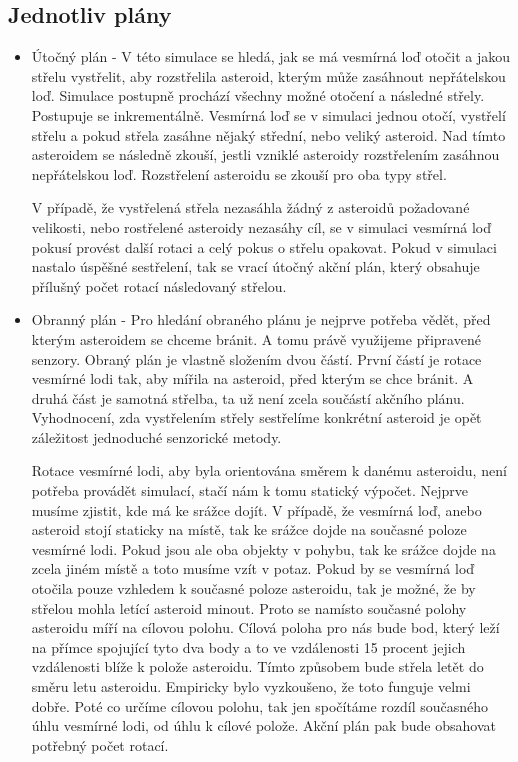 \subsection{Jednotliv plány}
\begin{itemize}
    \item Útočný plán - V této simulace se hledá, jak se má vesmírná loď otočit a jakou střelu vystřelit, aby rozstřelila asteroid, kterým může zasáhnout nepřátelskou loď.
        Simulace postupně prochází všechny možné otočení a následné střely. Postupuje se inkrementálně. Vesmírná loď se v simulaci jednou otočí, vystřelí střelu a pokud střela zasáhne nějaký střední, nebo veliký asteroid. 
        Nad tímto asteroidem se následně zkouší, jestli vzniklé asteroidy rozstřelením zasáhnou nepřátelskou loď. Rozstřelení asteroidu se zkouší pro oba typy střel.
        \par
        V případě, že vystřelená střela nezasáhla žádný z asteroidů požadované velikosti, nebo rostřelené asteroidy nezasáhy cíl, se v simulaci vesmírná loď pokusí provést další rotaci a celý pokus o střelu opakovat.
        Pokud v simulaci nastalo úspěšné sestřelení, tak se vrací útočný akční plán, který obsahuje přílušný počet rotací následovaný střelou.
    
    \item Obranný plán - Pro hledání obraného plánu je nejprve potřeba vědět, před kterým asteroidem se chceme bránit. 
        A tomu právě využijeme připravené senzory. Obraný plán je vlastně složením dvou částí. První částí je rotace vesmírné lodi tak, aby mířila na asteroid, před kterým se chce bránit.
        A druhá část je samotná střelba, ta už není zcela součástí akčního plánu. Vyhodnocení, zda vystřelením střely sestřelíme konkrétní asteroid je opět záležitost jednoduché senzorické metody.
        \par
        Rotace vesmírné lodi, aby byla orientována směrem k danému asteroidu, není potřeba provádět simulací, stačí nám k tomu statický výpočet.
        Nejprve musíme zjistit, kde má ke srážce dojít. V případě, že vesmírná loď, anebo asteroid stojí staticky na místě, tak ke srážce dojde na současné poloze vesmírné lodi.
        Pokud jsou ale oba objekty v pohybu, tak ke srážce dojde na zcela jiném místě a toto musíme vzít v potaz.
        Pokud by se vesmírná loď otočila pouze vzhledem k současné poloze asteroidu, tak je možné, že by střelou mohla letící asteroid minout.
        Proto se namísto současné polohy asteroidu míří na cílovou polohu.
        Cílová poloha pro nás bude bod, který leží na přímce spojující tyto dva body a to ve vzdálenosti 15 procent jejich vzdálenosti blíže k polože asteroidu. 
        Tímto způsobem bude střela letět do směru letu asteroidu. Empiricky bylo vyzkoušeno, že toto funguje velmi dobře.
        Poté co určíme cílovou polohu, tak jen spočítáme rozdíl současného úhlu vesmírné lodi, od úhlu k cílové polože.
        Akční plán pak bude obsahovat potřebný počet rotací.       
    

\end{itemize}
